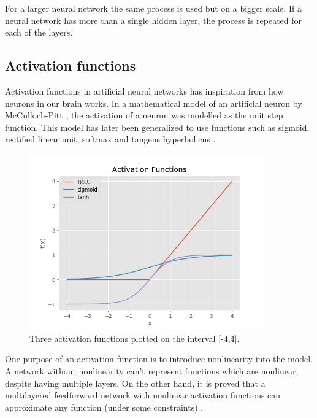 For a larger neural network the same process is used but on a bigger scale. If a neural network has more than a single hidden layer, the process is repeated for each of the layers.




\subsection{Activation functions} %
\label{activation_functions}

Activation functions in artificial neural networks has inspiration from how neurons in our brain works. In a mathematical model of an artificial neuron by McCulloch-Pitt \cite{mcculloch_logical_1943}, the activation of a neuron was modelled as the unit step function. This model has later been generalized to use functions such as sigmoid, rectified linear unit, softmax and tangens hyperbolicus \cite{jain_artificial_1996}.

\begin{figure}[H]
  \centering
    \includegraphics[width=0.9\textwidth]{Assets/Chapter2_Theory/activation_function_overview.png}
    \caption{Three activation functions plotted on the interval [-4,4].}
\end{figure}

One purpose of an activation function is to introduce nonlinearity into the model. A network without nonlinearity can't represent functions which are nonlinear, despite having multiple layers. On the other hand, it is proved that a multilayered feedforward network with nonlinear activation functions can approximate any function (under some constraints) \cite{leshno_multilayer_1993}.

